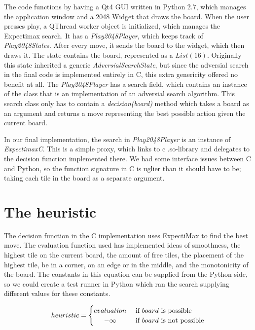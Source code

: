 The code functions by having a Qt4 GUI written in Python 2.7, which
manages the application window and a 2048 Widget that draws the board.
When the user presses play, a QThread worker object is initialized, which
manages the Expectimax search. It has a \emph{Play2048Player}, which keeps track of
\emph{Play2048State}s. After every move, it sends the board to the widget, which then draws it.
The state contains the board, represented as a \(List(16)\). Originally this
state inherited a generic \emph{AdversialSearchState}, but since the adversial
search in the final code is implemented entirely in C, this extra
genericity offered no benefit at all. The \emph{Play2048Player} has a search field, which
contains an instance of the class that is an implementation of an adversial search algorithm. This
search class only has to contain a \emph{decision(board)} method which takes a board
as an argument and returns a move representing the best possible action
given the current board.

In our final implementation, the search in \emph{Play2048Player} is an instance of
\emph{ExpectimaxC}. This is a simple proxy, which links to c .so-library and delegates
to the decision function implemented there. We had some interface issues between
C and Python, so the function signature in C is uglier than it should have to
be; taking each tile in the board as a separate argument.



\newpage
\section{The heuristic}

The decision function in the C implementation uses ExpectiMax to find the best move.
The evaluation function used has implemented ideas of smoothness, the highest tile
on the current board, the amount of free tiles, the placement of the highest tile,
be in a corner, on an edge or in the middle, and the monotonicity of the board.
The constants in this equation can be supplied from the Python side, so we
could create a test runner in Python which ran the search supplying different
values for these constants.

\[
 heuristic =
  \begin{cases}
      \hfill evaluation \hfill & \text{ if $board$ is possible} \\
      \hfill -\infty \hfill & \text{ if $board$ is not possible} \\
  \end{cases}
\]


